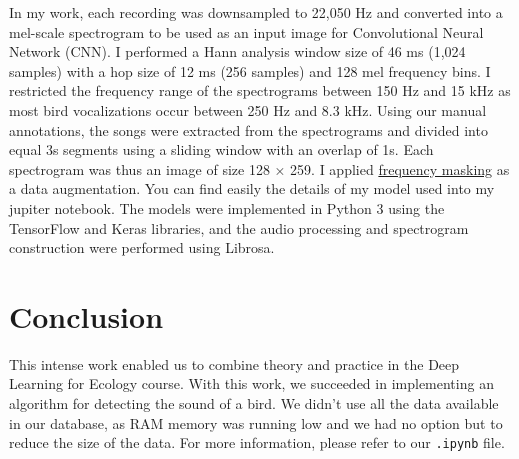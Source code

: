 \documentclass[conference]{IEEEtran}
\begin{document}
In my work, each recording was downsampled to 22,050 Hz and converted into a
mel-scale spectrogram to be used as an input image for Convolu­tional Neural Network (CNN). I performed a Hann analysis window
size of 46 ms (1,024 samples) with a hop size of 12 ms (256 samples) and
128 mel frequency bins. I restricted the
frequency range of the spectrograms between 150 Hz and 15 kHz as
most bird vocalizations occur between 250 Hz and 8.3 kHz. 
Using our manual annotations, the songs
were extracted from the spectrograms and divided into equal 3s seg­ments using a sliding window with an overlap of 1s. Each spectrogram
was thus an image of size 128 × 259.
I applied \href{https://www.soundgym.co/blog/item?id=four-ways-to-fix-frequency-masking-in-your-mix}{frequency masking} as a data
augmentation.  You can find easily the details of my model used into my jupiter notebook. The models were imple­mented in Python 3 using the TensorFlow and Keras libraries, and the audio processing and spectrogram construction were performed using Librosa.

	\section{Conclusion}
This intense work enabled us to combine theory and practice in the Deep Learning for Ecology course. With this work, we succeeded in implementing an algorithm for detecting the sound of a bird. We didn't use all the data available in our database, as RAM memory was running low and we had no option but to reduce the size of the data. For more information, please refer to our \texttt{.ipynb} file.

	
	
\end{document}
